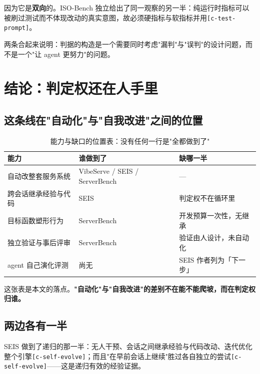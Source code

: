 因为它是\textbf{双向}的。ISO-Bench 独立给出了同一观察的另一半：纯运行时指标可以被刷过测试而不体现改动的真实意图，故必须硬指标与软指标并用{\scriptsize\texttt{[c-\hspace{0pt}test-\hspace{0pt}prompt]}}。


两条合起来说明：判据的构造是一个需要同时考虑"漏判"与"误判"的设计问题，而不是一个"让 agent 更努力"的问题。


\section{结论：判定权还在人手里}

\subsection{这条线在"自动化"与"自我改进"之间的位置}

\begin{table}[t]
\centering
\footnotesize
\setlength{\tabcolsep}{4pt}
\caption{能力与缺口的位置表：没有任何一行是"全都做到了"}
\label{tab:6}
\begin{tabularx}{\textwidth}{lXl}
\toprule
能力 & 谁做到了 & 缺哪一半 \\
\midrule
自动改整套服务系统 & VibeServe / SEIS / ServerBench & — \\
跨会话继承经验与代码 & SEIS & 判定权不在循环里 \\
目标函数塑形行为 & ServerBench & 开发预算一次性，无继承 \\
独立验证与事后评审 & ServerBench & 验证由人设计，未自动化 \\
agent 自己演化评测 & 尚无 & SEIS 作者列为「下一步」 \\
\bottomrule
\end{tabularx}
\end{table}

这张表是本文的落点。\textbf{"自动化"与"自我改进"的差别不在能不能爬坡，而在判定权归谁。}


\subsection{两边各有一半}

SEIS 做到了递归的那一半：无人干预、会话之间继承经验与代码改动、迭代优化整个引擎{\scriptsize\texttt{[c-\hspace{0pt}self-\hspace{0pt}evolve]}}；而且"在早前会话上继续"胜过各自独立的尝试{\scriptsize\texttt{[c-\hspace{0pt}self-\hspace{0pt}evolve]}}——这是递归有效的经验证据。


